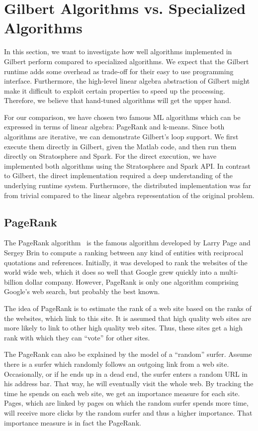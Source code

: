 \section{Gilbert Algorithms vs. Specialized Algorithms}

In this section, we want to investigate how well algorithms implemented in Gilbert perform compared to specialized algorithms.
We expect that the Gilbert runtime adds some overhead as trade-off for their easy to use programming interface.
Furthermore, the high-level linear algebra abstraction of Gilbert might make it difficult to exploit certain properties to speed up the processing.
Therefore, we believe that hand-tuned algorithms will get the upper hand.

For our comparison, we have chosen two famous ML algorithms which can be expressed in terms of linear algebra: PageRank and k-means.
Since both algorithms are iterative, we can demonstrate Gilbert's loop support.
We first execute them directly in Gilbert, given the Matlab code, and then run them directly on Stratosphere and Spark.
For the direct execution, we have implemented both algorithms using the Stratosphere and Spark API.
In contrast to Gilbert, the direct implementation required a deep understanding of the underlying runtime system.
Furthermore, the distributed implementation was far from trivial compared to the linear algebra representation of the original problem.

\subsection{PageRank}

The PageRank algorithm~\cite{page:1999a} is the famous algorithm developed by Larry Page and Sergey Brin to compute a ranking between any kind of entities with reciprocal quotations and references.
Initially, it was developed to rank the websites of the world wide web, which it does so well that Google grew quickly into a multi-billion dollar company.
However, PageRank is only one algorithm comprising Google's web search, but probably the best known.

The idea of PageRank is to estimate the rank of a web site based on the ranks of the websites, which link to this site.
It is assumed that high quality web sites are more likely to link to other high quality web sites.
Thus, these sites get a high rank with which they can ``vote'' for other sites.

The PageRank can also be explained by the model of a ``random'' surfer.
Assume there is a surfer which randomly follows an outgoing link from a web site.
Occasionally, or if he ends up in a dead end, the surfer enters a random URL in his address bar.
That way, he will eventually visit the whole web.
By tracking the time he spends on each web site, we get an importance measure for each site.
Pages, which are linked by pages on which the random surfer spends more time, will receive more clicks by the random surfer and thus a higher importance.
That importance measure is in fact the PageRank.

